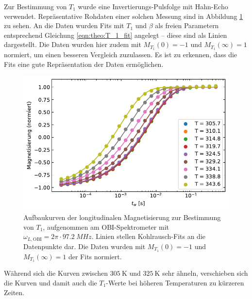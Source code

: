Zur Bestimmung von $T_1$ wurde eine Invertierungs-Pulsfolge mit Hahn-Echo verwendet. Repräsentative Rohdaten einer solchen Messung sind in Abbildung \ref{fig:res:T_1_roh} zu sehen. An die Daten wurden Fits mit $T_1$ und $\beta$ als freien Parametern entsprechend Gleichung \eqref{eqn:theo:T_1_fit} angelegt -- diese sind als Linien dargestellt. Die Daten wurden hier zudem mit $M_{T_1}(0) = -1$ und $M_{T_1}(\infty) = 1$ normiert, um einen besseren Vergleich zuzulassen. Es ist zu erkennen, dass die Fits eine gute Repräsentation der Daten ermöglichen.
\begin{figure}
	\begin{center}
		\includegraphics[width=.8\textwidth]{graphics/plot/t1_roh3.pdf}
	\end{center}
	\caption{Aufbaukurven der longitudinalen Magnetisierung zur Bestimmung von $T_1$, aufgenommen am OBI-Spektrometer mit $\omega_{L, \text{OBI}} = 2\pi \cdot \SI{97.2}{MHz}$. Linien stellen Kohlrausch-Fits an die Datenpunkte dar. Die Daten wurden mit $M_{T_1}(0) = -1$ und $M_{T_1}(\infty) = 1$ der Fits normiert.} \label{fig:res:T_1_roh}
\end{figure}

Während sich die Kurven zwischen $\SI{305}{\kelvin}$ und $\SI{325}{\kelvin}$ sehr ähneln, verschieben sich die Kurven und damit auch die $T_1$-Werte bei höheren Temperaturen zu kürzeren Zeiten.

